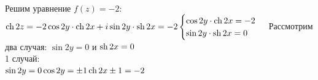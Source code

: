 \\
Решим уравнение $ f(z) = -2 $:\\
$
	\operatorname{ch} 2z = -2
	\\[1em]
	\cos 2y \cdot \operatorname{ch} 2x + i \sin 2y \cdot \operatorname{sh} 2x = -2
	\\[1em]
	\begin{cases}
		\cos 2y \cdot \operatorname{ch} 2x = -2 \\
		\sin 2y \cdot \operatorname{sh} 2x = 0
	\end{cases}
	\\[1em]
$
Рассмотрим два случая: $ \sin 2y = 0 $ и $ \operatorname{sh} 2x = 0 $
\\[1em]
1 случай:
\\[1em]
$
	\sin 2y = 0
	\\[1em]
	\cos 2y = \pm 1
	\\[1em]
	\operatorname{ch} 2x \pm 1 = -2
$
